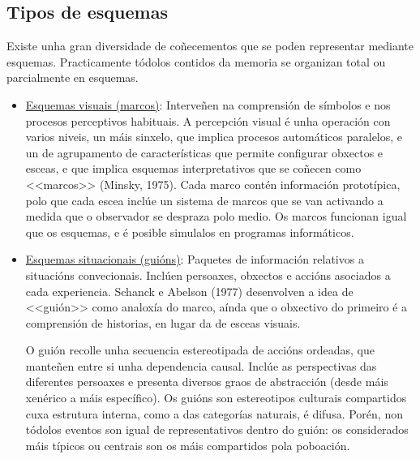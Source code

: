 \documentclass[a4paper,11pt]{article}
\begin{document}
\subsection{Tipos de esquemas}
Existe unha gran diversidade de coñecementos que se poden representar mediante esquemas. Practicamente tódolos contidos da memoria se organizan total ou parcialmente en esquemas.

\begin{itemize}
	\item \underline{Esquemas visuais (marcos)}: Interveñen na comprensión de símbolos e nos 
	procesos perceptivos habituais. A percepción visual é unha operación con varios niveis, un máis 
	sinxelo, que implica procesos automáticos paralelos, e un de agrupamento de características que 
	permite configurar obxectos e esceas, e que implica esquemas interpretativos que se coñecen como 
	<<marcos>> (Minsky, 1975). Cada marco contén información prototípica, polo que cada escea inclúe 
	un sistema de marcos que se van activando a medida que o observador se despraza polo medio. Os 
	marcos funcionan igual que os esquemas, e é posible simulalos en programas informáticos.
	\item \underline{Esquemas situacionais (guións)}: Paquetes de información relativos a situacións 
	convecionais. Inclúen persoaxes, obxectos e accións asociados a cada experiencia. Schanck e 
	Abelson (1977) desenvolven a idea de <<guión>> como analoxía do marco, aínda que o obxectivo do 
	primeiro é a comprensión de historias, en lugar da de esceas visuais.
	
	O guión recolle unha secuencia estereotipada de accións ordeadas, que manteñen entre si unha 
	dependencia causal. Inclúe as perspectivas das diferentes persoaxes e presenta diversos graos de 
	abstracción (desde máis xenérico a máis específico). Os guións son estereotipos culturais 
	compartidos cuxa estrutura interna, como a das categorías naturais, é difusa. Porén, non tódolos 
	eventos son igual de representativos dentro do guión: os considerados máis típicos ou centrais 
	son os máis compartidos pola poboación.
	

\end{itemize}
\end{document}
